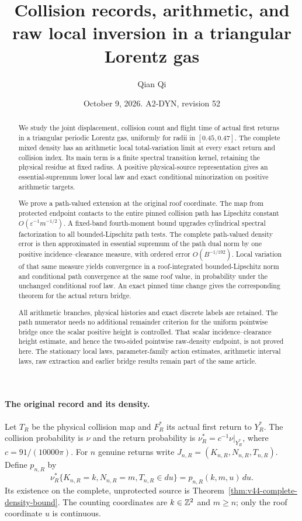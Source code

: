 \documentclass[11pt,reqno]{amsart}
\title[Collision records and raw local inversion]{Collision records, arithmetic, and raw local inversion in a triangular Lorentz gas}
\author{Qian Qi}
\date{October 9, 2026. A2-DYN, revision 52}
\numberwithin{equation}{section}
\theoremstyle{definition}\newtheorem{definition}[theorem]{Definition}
\theoremstyle{remark}\newtheorem{remark}[theorem]{Remark}
\begin{document}
\raggedbottom
\begin{abstract}
We study the joint displacement, collision count and flight time of
actual first returns in a triangular periodic Lorentz gas, uniformly
for radii in $[0.45,0.47]$. The complete mixed density has an arithmetic
local total-variation limit at every exact return and collision index.
Its main term is a finite spectral transition kernel, retaining the
physical residue at fixed radius. A positive physical-source
representation gives an essential-supremum lower local law and exact
conditional minorization on positive arithmetic targets.

We prove a path-valued extension at the original roof coordinate.
The map from protected endpoint contacts to the entire pinned collision
path has Lipschitz constant $O(\varepsilon^{-1}m^{-1/2})$.
A fixed-band fourth-moment bound upgrades cylindrical spectral
factorization to all bounded-Lipschitz path tests. The complete
path-valued density error is then approximated in essential supremum
of the path dual norm by one positive incidence--clearance measure,
with ordered error $O(B^{-1/192})$. Local variation of that same measure
yields convergence in a roof-integrated bounded-Lipschitz norm and
conditional path convergence at the same roof value, in probability
under the unchanged conditional roof law. An exact pinned time change
gives the corresponding theorem for the actual return bridge.

All arithmetic branches, physical histories and exact discrete labels
are retained. The path numerator needs no additional remainder
criterion for the uniform pointwise bridge once the scalar positive
height is controlled. That scalar incidence--clearance height estimate,
and hence the two-sided pointwise raw-density endpoint, is not proved
here. The stationary local laws, parameter-family action estimates,
arithmetic interval laws, raw extraction and earlier bridge results
remain part of the same article.
\end{abstract}
\maketitle

\paragraph{The original record and its density.}
Let $T_R$ be the physical collision map and $F_R^*$ its actual first
return to $Y_R^*$. The collision probability is $\nu$ and the return
probability is $\nu_R^*=c^{-1}\nu|_{Y_R^*}$, where
$c=91/(10000\pi)$. For $n$ genuine returns write
$J_{n,R}=(K_{n,R},N_{n,R},T_{n,R})$. Define $p_{n,R}$ by
\[
 \nu_R^*\{K_{n,R}=k,N_{n,R}=m,T_{n,R}\in du\}
                  =p_{n,R}(k,m,u)\,du.
\]
Its existence on the complete, unprotected source is
Theorem~\ref{thm:v44-complete-density-bound}. The counting coordinates
are $k\in\mathbb Z^2$ and $m\ge n$; only the roof coordinate $u$ is continuous.
\end{document}
